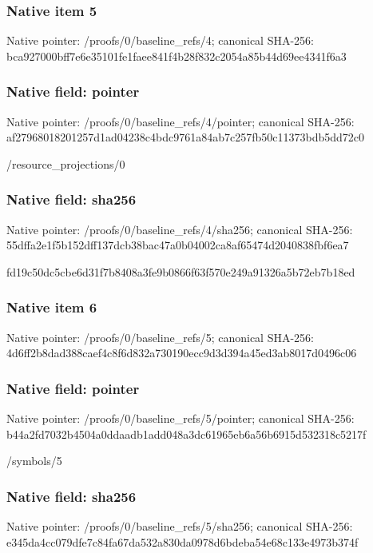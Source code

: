 \documentclass[10pt,a4paper]{article}
\begin{document}
\subsubsection{Native item 5}
Native pointer: /proofs/0/baseline\_\allowbreak{}refs/4; canonical SHA-256: bca927000bff7e6e35101fe1faee841f4b28f832c2054a85b44d69ee4341f6a3

\subsubsection{Native field: pointer}
Native pointer: /proofs/0/baseline\_\allowbreak{}refs/4/pointer; canonical SHA-256: af27968018201257d1ad04238c4bdc9761a84ab7c257fb50c11373bdb5dd72c0

\begingroup\raggedright\sloppy /\allowbreak{}resource\_\allowbreak{}projections/\allowbreak{}0\par\endgroup

\subsubsection{Native field: sha256}
Native pointer: /proofs/0/baseline\_\allowbreak{}refs/4/sha256; canonical SHA-256: 55dffa2e1f5b152dff137dcb38bac47a0b04002ca8af65474d2040838fbf6ea7

\begingroup\raggedright\sloppy fd19c50dc5cbe6d31f7b8408a3fe9b0866f63f570e249a91326a5b72eb7b18ed\par\endgroup

\subsubsection{Native item 6}
Native pointer: /proofs/0/baseline\_\allowbreak{}refs/5; canonical SHA-256: 4d6ff2b8dad388caef4c8f6d832a730190ecc9d3d394a45ed3ab8017d0496c06

\subsubsection{Native field: pointer}
Native pointer: /proofs/0/baseline\_\allowbreak{}refs/5/pointer; canonical SHA-256: b44a2fd7032b4504a0ddaadb1add048a3dc61965eb6a56b6915d532318c5217f

\begingroup\raggedright\sloppy /\allowbreak{}symbols/\allowbreak{}5\par\endgroup

\subsubsection{Native field: sha256}
Native pointer: /proofs/0/baseline\_\allowbreak{}refs/5/sha256; canonical SHA-256: e345da4cc079dfe7c84fa67da532a830da0978d6bdeba54e68c133e4973b374f
\end{document}
